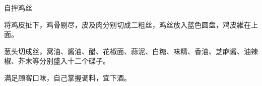 \begin{recipe}{自拌鸡丝}

\ingredients


\preparation

\step 将鸡皮扯下，鸡骨剔尽，皮及肉分别切成二粗丝，鸡丝放入蓝色圆盘，鸡皮維在上
面。

\step 葱头切成丝，窝油、酱油、醋、花椒面、蒜泥、白糖、味精、香油、芝麻酱、油辣
椒、芥末等分别盛入十二个碟子。

\features

满足顾客口味，自己掌握调料，宜下酒。

\end{recipe}

